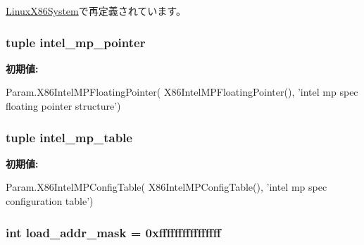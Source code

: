 \hyperlink{classX86System_1_1LinuxX86System_a17da7064bc5c518791f0c891eff05fda}{LinuxX86System}で再定義されています。\hypertarget{classX86System_1_1X86System_a11f2b7ef9e8e393db69cb20d02507b5f}{
\subsubsection[{intel\_\-mp\_\-pointer}]{\setlength{\rightskip}{0pt plus 5cm}tuple {\bf intel\_\-mp\_\-pointer}}}
\label{classX86System_1_1X86System_a11f2b7ef9e8e393db69cb20d02507b5f}
{\bfseries 初期値:}
\begin{DoxyCode}
Param.X86IntelMPFloatingPointer(
            X86IntelMPFloatingPointer(),
            'intel mp spec floating pointer structure')
\end{DoxyCode}
\hypertarget{classX86System_1_1X86System_a0e6ba9bdc7c99683f154358704494613}{
\subsubsection[{intel\_\-mp\_\-table}]{\setlength{\rightskip}{0pt plus 5cm}tuple {\bf intel\_\-mp\_\-table}}}
\label{classX86System_1_1X86System_a0e6ba9bdc7c99683f154358704494613}
{\bfseries 初期値:}
\begin{DoxyCode}
Param.X86IntelMPConfigTable(
            X86IntelMPConfigTable(),
            'intel mp spec configuration table')
\end{DoxyCode}
\hypertarget{classX86System_1_1X86System_abd9c5cc6b7da624a69344d571bab1038}{
\subsubsection[{load\_\-addr\_\-mask}]{\setlength{\rightskip}{0pt plus 5cm}int {\bf load\_\-addr\_\-mask} = 0xffffffffffffffff}}
